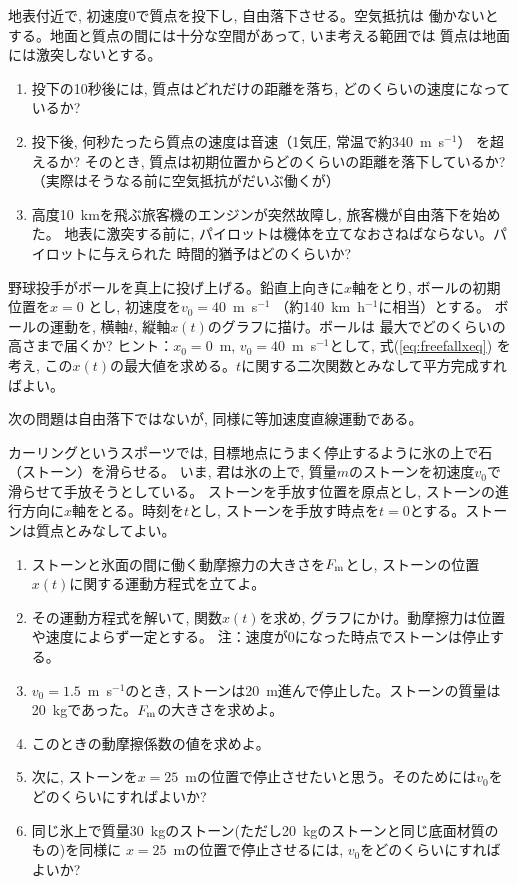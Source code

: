 \begin{q}\label{q:freefall1}
地表付近で, 初速度0で質点を投下し, 自由落下させる。空気抵抗は
働かないとする。地面と質点の間には十分な空間があって, いま考える範囲では
質点は地面には激突しないとする。
\begin{enumerate}
\item 投下の10秒後には, 質点はどれだけの距離を落ち, どのくらいの速度になっているか? 
\item 投下後, 何秒たったら質点の速度は音速（1気圧, 常温で約340~m~s$^{-1}$）
を超えるか? そのとき, 質点は初期位置からどのくらいの距離を落下しているか? 
（実際はそうなる前に空気抵抗がだいぶ働くが）
\item 高度10~kmを飛ぶ旅客機のエンジンが突然故障し, 旅客機が自由落下を始めた。
地表に激突する前に, パイロットは機体を立てなおさねばならない。パイロットに与えられた
時間的猶予はどのくらいか?
\end{enumerate}
\end{q}
\mv

\begin{q}\label{q:baseball0}
野球投手がボールを真上に投げ上げる。鉛直上向きに$x$軸をとり, ボールの初期位置を$x=0$
とし, 初速度を$v_0=40$~m~s$^{-1}$ （約140~km~h$^{-1}$に相当）とする。
ボールの運動を, 横軸$t$, 縦軸$x(t)$のグラフに描け。ボールは
最大でどのくらいの高さまで届くか?
ヒント：$x_0=0$~m, $v_0=40$~m~s$^{-1}$として, 式(\ref{eq:freefallxeq})
を考え, この$x(t)$の最大値を求める。$t$に関する二次関数とみなして平方完成すればよい。
\end{q}
\mv

次の問題は自由落下ではないが, 同様に等加速度直線運動である。

\begin{q}\label{q:curling}
カーリングというスポーツでは, 
目標地点にうまく停止するように氷の上で石（ストーン）を滑らせる。
いま, 君は氷の上で, 質量$m$のストーンを初速度$v_0$で滑らせて手放そうとしている。
ストーンを手放す位置を原点とし, ストーンの進行方向に$x$軸をとる。時刻を$t$とし, 
ストーンを手放す時点を$t=0$とする。ストーンは質点とみなしてよい。
\begin{enumerate}
\item ストーンと氷面の間に働く動摩擦力の大きさを$F_{\text m}$とし, ストーンの位置$x(t)$に関する運動方程式を立てよ。
\item その運動方程式を解いて, 関数$x(t)$を求め, グラフにかけ。動摩擦力は位置や速度によらず一定とする。
注：速度が0になった時点でストーンは停止する。
\item $v_0=1.5$~m~s$^{-1}$のとき, ストーンは20~m進んで停止した。ストーンの質量は20~kgであった。$F_{\text m}$の大きさを求めよ。
\item このときの動摩擦係数の値を求めよ。
\item 次に, ストーンを$x=25$~mの位置で停止させたいと思う。そのためには$v_0$をどのくらいにすればよいか?
\item 同じ氷上で質量30~kgのストーン(ただし20~kgのストーンと同じ底面材質のもの)を同様に
$x=25$~mの位置で停止させるには, $v_0$をどのくらいにすればよいか?
\end{enumerate}
\end{q}
\mv

